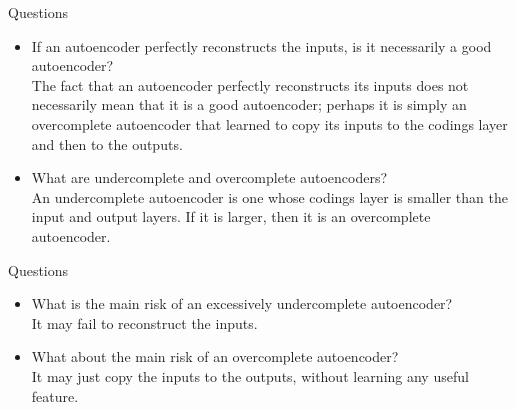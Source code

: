 \documentclass[handout]{beamer}
\begin{document}
\begin{frame}[t]{Questions}
    \begin{itemize}
        \item If an autoencoder perfectly reconstructs the inputs, is it necessarily a good autoencoder?\\ 
            \vspace{.3cm}
\pause
The fact that an autoencoder perfectly reconstructs its inputs does not necessarily mean that it is a good autoencoder; perhaps it is simply an overcomplete autoencoder that learned to copy its inputs to the codings layer and then to the outputs.
            \vspace{.3cm}
\pause
        \item What are undercomplete and overcomplete autoencoders?\\ 
            \vspace{.3cm}
            \pause    
An undercomplete autoencoder is one whose codings layer is smaller than the input and output layers. If it is larger, then it is an overcomplete autoencoder.
    \end{itemize}    
\end{frame}


\begin{frame}[t]{Questions}
    \begin{itemize}
        \item What is the main risk of an excessively undercomplete autoencoder? \\
            \vspace{.3cm}
            \pause
It may fail to reconstruct the inputs.
            \vspace{.3cm}
            \pause
        \item What about the main risk of an overcomplete autoencoder?\\
            \vspace{.3cm}
            \pause
It may just copy the inputs to the outputs, without learning any useful feature.
    \end{itemize}    
\end{frame}

\end{document}
